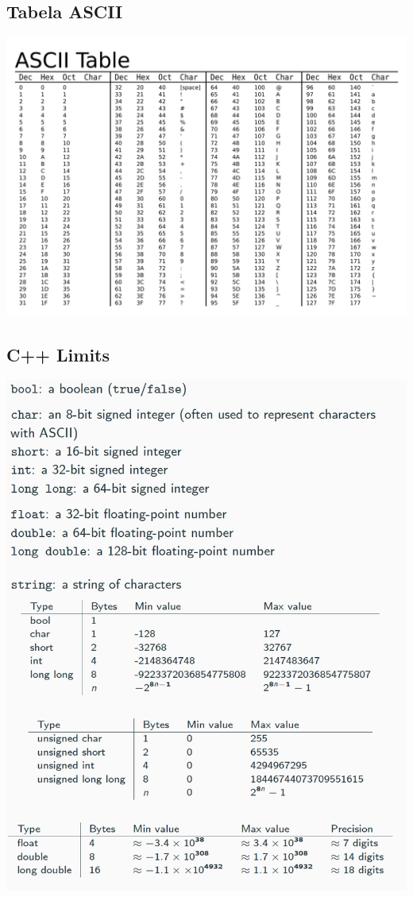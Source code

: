 \documentclass[a4paper,12pt]{article}
\begin{document}
\subsection{Tabela ASCII}
\begin{center}
  \includegraphics[width=\linewidth]{figures/outros/Ascii_Table.png}
\end{center}

\subsection{C++ Limits}
\begin{center}
  \includegraphics[width=\linewidth]{figures/outros/cpp_limits.png}
\end{center}
\end{document}
